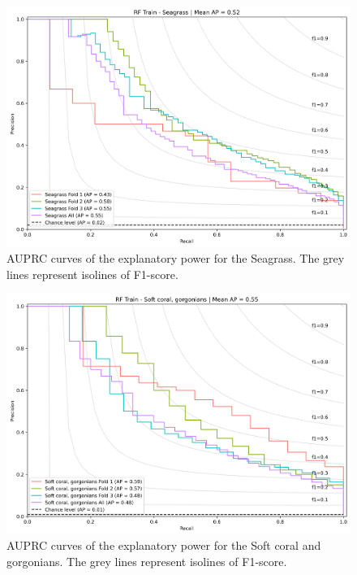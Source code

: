 \begin{figure}
\hypertarget{fig:chap3figS32}{%
\centering
\includegraphics{03-Chapitre3/figures/supplementary/03-precision_recall_curve_train_rf_Seagrass.png}
\caption{AUPRC curves of the explanatory power for the Seagrass. The
grey lines represent isolines of F1-score.}\label{fig:chap3figS32}
}
\end{figure}

\begin{figure}
\hypertarget{fig:chap3figS33}{%
\centering
\includegraphics{03-Chapitre3/figures/supplementary/03-precision_recall_curve_train_rf_Soft coral, gorgonians.png}
\caption{AUPRC curves of the explanatory power for the Soft coral and
gorgonians. The grey lines represent isolines of
F1-score.}\label{fig:chap3figS33}
}
\end{figure}

